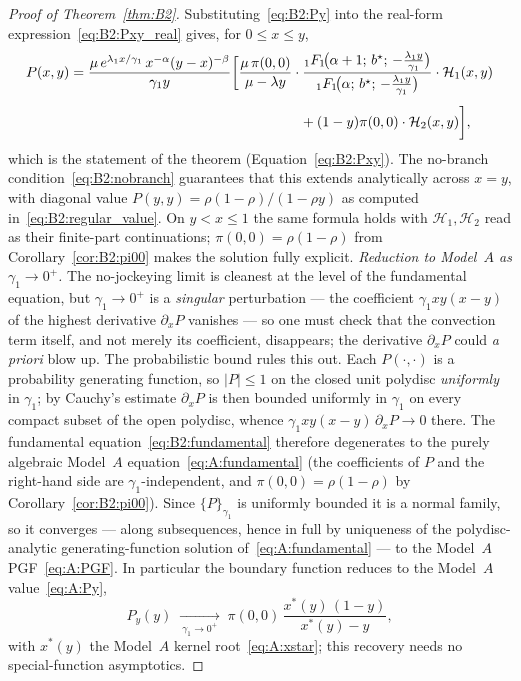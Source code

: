 \begin{proof}[Proof of Theorem~\ref{thm:B2}]
Substituting~\eqref{eq:B2:Py} into the real-form expression~\eqref{eq:B2:Pxy_real}
gives, for $0\le x\le y$,
\begin{align}
    P(x,y) &= \frac{\mu\,e^{\lambda_1 x/\gamma_1}\,x^{-\alpha}(y-x)^{-\beta}}{\gamma_1 y}
    \biggl[
        \frac{\mu\,\pi(0,0)}{\mu-\lambda y}
        \cdot\frac{{}_1F_1\!\bigl(\alpha+1;\,b^\star;\,-\tfrac{\lambda_1 y}{\gamma_1}\bigr)}
                  {{}_1F_1\!\bigl(\alpha;\,b^\star;\,-\tfrac{\lambda_1 y}{\gamma_1}\bigr)}
        \cdot\mathcal{H}_1(x,y)
    \nonumber\\[4pt]
    &\hspace{5.8cm}
        + (1-y)\pi(0,0)\cdot\mathcal{H}_2(x,y)
    \biggr],
    \label{eq:B2:Pxy_proof}
\end{align}
which is the statement of the theorem (Equation~\eqref{eq:B2:Pxy}).
The no-branch condition~\eqref{eq:B2:nobranch} guarantees that this extends
analytically across $x=y$, with diagonal value
$P(y,y)=\rho(1-\rho)/(1-\rho y)$ as computed in~\eqref{eq:B2:regular_value}.
On $y<x\le1$ the same formula holds with $\mathcal{H}_1,\mathcal{H}_2$ read as their
finite-part continuations; $\pi(0,0)=\rho(1-\rho)$ from Corollary~\ref{cor:B2:pi00} makes
the solution fully explicit.
\smallskip\noindent\textit{Reduction to Model~$A$ as $\gamma_1\to0^{+}$.}
The no-jockeying limit is cleanest at the level of the fundamental equation, but
$\gamma_1\to0^{+}$ is a \emph{singular} perturbation --- the coefficient $\gamma_1 xy(x-y)$
of the highest derivative $\partial_x P$ vanishes --- so one must check that the convection
term itself, and not merely its coefficient, disappears; the derivative $\partial_x P$ could
\emph{a priori} blow up. The probabilistic bound rules this out. Each $P(\cdot,\cdot)$ is a
probability generating function, so $|P|\le1$ on the closed unit polydisc \emph{uniformly}
in $\gamma_1$; by Cauchy's estimate $\partial_x P$ is then bounded uniformly in $\gamma_1$ on
every compact subset of the open polydisc, whence $\gamma_1 xy(x-y)\,\partial_x P\to0$ there.
The fundamental equation~\eqref{eq:B2:fundamental} therefore degenerates to the purely
algebraic Model~$A$ equation~\eqref{eq:A:fundamental} (the coefficients of $P$ and the
right-hand side are $\gamma_1$-independent, and $\pi(0,0)=\rho(1-\rho)$ by
Corollary~\ref{cor:B2:pi00}). Since $\{P\}_{\gamma_1}$ is uniformly bounded it is a normal
family, so it converges --- along subsequences, hence in full by uniqueness of the
polydisc-analytic generating-function solution of~\eqref{eq:A:fundamental} --- to the
Model~$A$ PGF~\eqref{eq:A:PGF}. In particular the boundary function reduces to the Model~$A$
value~\eqref{eq:A:Py},
\begin{equation}
    P_y(y)\;\xrightarrow[\ \gamma_1\to0^{+}\ ]{}\;
    \pi(0,0)\,\frac{x^*(y)\,(1-y)}{x^*(y)-y},
    \label{eq:B2:Py_limit}
\end{equation}
with $x^*(y)$ the Model~$A$ kernel root~\eqref{eq:A:xstar}; this recovery needs no
special-function asymptotics.


\end{proof}
